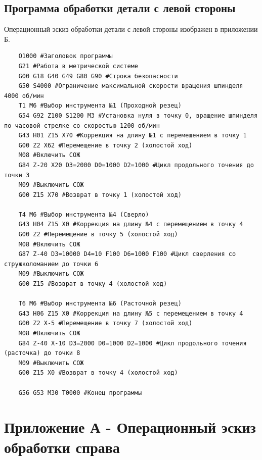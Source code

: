 \subsection{Программа обработки детали с левой стороны}

Операционный эскиз обработки детали с левой стороны изображен в приложении Б.

\begin{verbatim}
    O1000 #Заголовок программы
    G21 #Работа в метрической системе
    G00 G18 G40 G49 G80 G90 #Строка безопасности
    G50 S4000 #Ограничение максимальной скорости вращения шпинделя 4000 об/мин
    T1 M6 #Выбор инструмента №1 (Проходной резец)
    G54 G92 Z100 S1200 M3 #Установка нуля в точку 0, вращение шпинделя по часовой стрелке со скоростью 1200 об/мин
    G43 H01 Z15 X70 #Коррекция на длину №1 с перемещением в точку 1
    G00 Z2 X62 #Перемещение в точку 2 (холостой ход)
    M08 #Включить СОЖ
    G84 Z-20 X20 D3=2000 D0=1000 D2=1000 #Цикл продольного точения до точки 3
    M09 #Выключить СОЖ
    G00 Z15 X70 #Возврат в точку 1 (холостой ход)

    T4 M6 #Выбор инструмента №4 (Сверло)
    G43 H04 Z15 X0 #Коррекция на длину №4 с перемещением в точку 4
    G00 Z2 #Перемещение в точку 5 (холостой ход)
    M08 #Включить СОЖ
    G87 Z-40 D3=10000 D4=10 F100 D6=1000 F100 #Цикл сверления со стружколоманием до точки 6
    M09 #Выключить СОЖ
    G00 Z15 #Возврат в точку 4 (холостой ход)

    T6 M6 #Выбор инструмента №6 (Расточной резец)
    G43 H06 Z15 X0 #Коррекция на длину №5 с перемещением в точку 4
    G00 Z2 X-5 #Перемещение в точку 7 (холостой ход)
    M08 #Включить СОЖ
    G84 Z-40 X-10 D3=2000 D0=1000 D2=1000 #Цикл продольного точения (расточка) до точки 8
    M09 #Выключить СОЖ
    G00 Z15 X0 #Возврат в точку 4 (холостой ход)

    G56 G53 M30 T0000 #Конец программы
\end{verbatim}

\section*{Приложение А - Операционный эскиз обработки справа}

